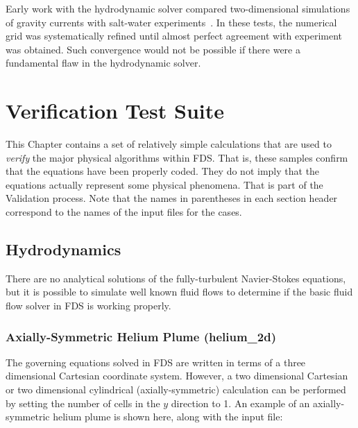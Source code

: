 \documentclass[11pt]{book}
\begin{document}
Early work with the hydrodynamic solver compared two-dimensional
simulations of gravity currents with salt-water
experiments~\cite{McGrattan:1}. In these tests, the numerical grid was
systematically refined until almost perfect agreement with experiment
was obtained. Such convergence would not be possible if there were a
fundamental flaw in the hydrodynamic solver.





\chapter{Verification Test Suite}
\label{verification_suite}

This Chapter contains a set of relatively simple
calculations that are used to {\em verify} the major physical
algorithms within FDS.  That is, these samples confirm that the
equations have been properly coded.  They do not imply that the
equations actually represent some physical phenomena.  That is part of the Validation process. Note that the names in parentheses in each section header
correspond to the names of the input files for the cases.



\section{Hydrodynamics}

There are no analytical solutions of the fully-turbulent Navier-Stokes equations, but it is possible to simulate well
known fluid flows to determine if the basic fluid flow solver in FDS is working properly.



\subsection{Axially-Symmetric Helium Plume ({\bf helium\_2d}) }
\label{helium_2d}

The governing equations solved in FDS are written in terms of a
three dimensional Cartesian coordinate system. However,
a two dimensional Cartesian or two dimensional cylindrical
(axially-symmetric) calculation can be performed by setting the number of
cells in the $y$ direction to 1.
An example of an axially-symmetric helium plume is shown here, along with the input file:
\end{document}
